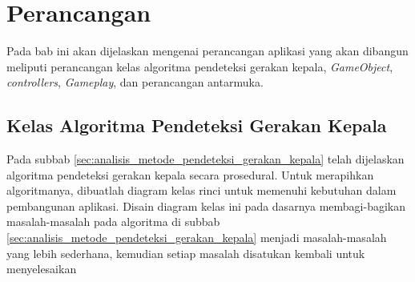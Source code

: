 \chapter{Perancangan}
\label{chap:perancangan}


Pada bab ini akan dijelaskan mengenai perancangan aplikasi yang akan dibangun meliputi perancangan kelas algoritma pendeteksi gerakan kepala, \textit{GameObject}, \textit{controllers}, \textit{Gameplay}, dan perancangan antarmuka.

\section{Kelas Algoritma Pendeteksi Gerakan Kepala}
\label{sec:perancangan_kelas_algoritma_Pendeteksi_Gerakan_Kepala}

Pada subbab \ref{sec:analisis_metode_pendeteksi_gerakan_kepala} telah dijelaskan algoritma pendeteksi gerakan kepala secara prosedural. Untuk merapihkan algoritmanya, dibuatlah diagram kelas rinci untuk memenuhi kebutuhan dalam pembangunan aplikasi. Disain diagram kelas ini pada dasarnya membagi-bagikan masalah-masalah pada algoritma di subbab \ref{sec:analisis_metode_pendeteksi_gerakan_kepala} menjadi masalah-masalah yang lebih sederhana, kemudian setiap masalah disatukan kembali untuk menyelesaikan 